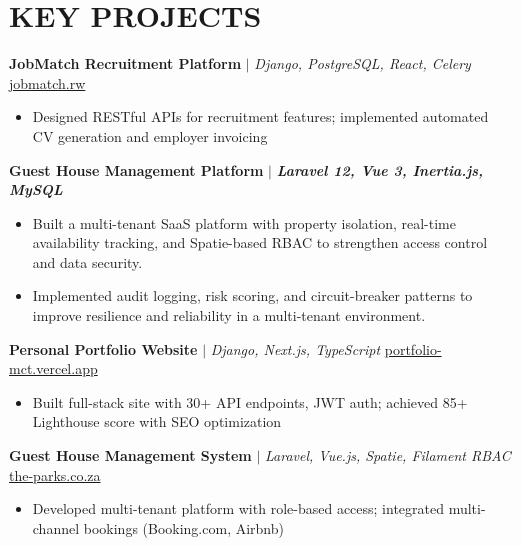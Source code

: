 \documentclass[9pt,a4paper]{article}
\begin{document}
\vspace{-2pt}

\section*{KEY PROJECTS}

\small
\textbf{JobMatch Recruitment Platform} $|$ \textit{Django, PostgreSQL, React, Celery} \hfill \href{https://www.jobmatch.rw}{jobmatch.rw}
\begin{itemize}[leftmargin=11pt]
    \item Designed RESTful APIs for recruitment features; implemented automated CV generation and employer invoicing
\end{itemize}

\vspace{1pt}

\textbf{Guest House Management Platform} $|$ \textit{\textbf{Laravel 12, Vue 3, Inertia.js, MySQL}}
\begin{itemize}
    \item Built a multi-tenant SaaS platform with property isolation, real-time availability tracking, and Spatie-based RBAC to strengthen access control and data security.
    \item Implemented audit logging, risk scoring, and circuit-breaker patterns to improve resilience and reliability in a multi-tenant environment.
\end{itemize}

\vspace{1pt}

\textbf{Personal Portfolio Website} $|$ \textit{Django, Next.js, TypeScript} \hfill \href{https://portfolio-mct.vercel.app}{portfolio-mct.vercel.app}
\begin{itemize}[leftmargin=11pt]
    \item Built full-stack site with 30+ API endpoints, JWT auth; achieved 85+ Lighthouse score with SEO optimization
\end{itemize}

\vspace{1pt}

\textbf{Guest House Management System} $|$ \textit{Laravel, Vue.js, Spatie, Filament RBAC} \hfill \href{https://the-parks.co.za}{the-parks.co.za}
\begin{itemize}[leftmargin=11pt]
    \item Developed multi-tenant platform with role-based access; integrated multi-channel bookings (Booking.com, Airbnb)
\end{itemize}
\end{document}
